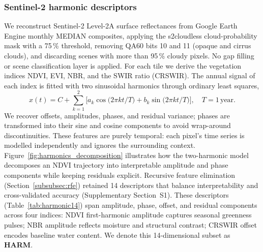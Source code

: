 \documentclass[utf8]{FrontiersinHarvard}
\begin{document}
\subsubsection{Sentinel-2 harmonic descriptors}
We reconstruct Sentinel-2 Level-2A surface reflectances from Google Earth Engine monthly MEDIAN composites, applying the s2cloudless cloud-probability mask with a 75\,\% threshold, removing QA60 bits 10 and 11 (opaque and cirrus clouds), and discarding scenes with more than 95\,\% cloudy pixels. No gap filling or scene classification layer is applied. For each tile we derive the vegetation indices NDVI, EVI, NBR, and the SWIR ratio (CRSWIR). The annual signal of each index is fitted with two sinusoidal harmonics through ordinary least squares,
\[
  x(t) = C + \sum_{k=1}^{2} \big[a_k \cos\!\big(2\pi k t/T\big) + b_k \sin\!\big(2\pi k t/T\big)\big], \quad T = 1\,\text{year}.
\]
We recover offsets, amplitudes, phases, and residual variance; phases are transformed into their sine and cosine components to avoid wrap-around discontinuities. These features are purely temporal: each pixel's time series is modelled independently and ignores the surrounding context. Figure~\ref{fig:harmonics_decomposition} illustrates how the two-harmonic model decomposes an NDVI trajectory into interpretable amplitude and phase components while keeping residuals explicit. Recursive feature elimination (Section~\ref{subsubsec:rfe}) retained 14 descriptors that balance interpretability and cross-validated accuracy (Supplementary Section~S1). These descriptors (Table~\ref{tab:harmonic14}) span amplitude, phase, offset, and residual components across four indices: NDVI first-harmonic amplitude captures seasonal greenness pulses; NBR amplitude reflects moisture and structural contrast; CRSWIR offset encodes baseline water content. We denote this 14-dimensional subset as \textbf{HARM}.
\end{document}
